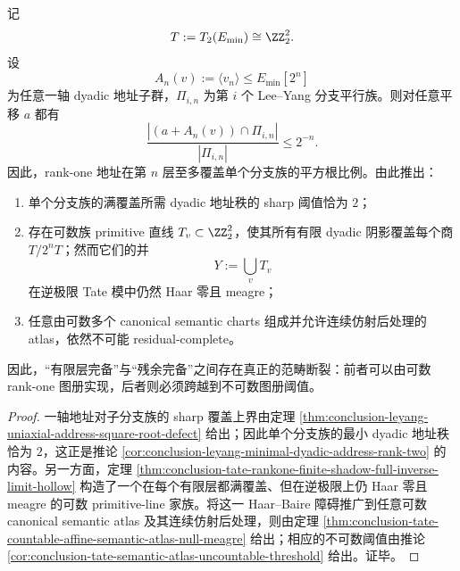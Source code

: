 \begin{theorem}\label{thm:conclusion-rankone-atlas-uncountable-residual-threshold}
记
\[
T:=T_2(E_{\min})\cong \ZZ_2^2.
\]
设
\[
A_n(v):=\langle v_n\rangle\le E_{\min}[2^n]
\]
为任意一轴 dyadic 地址子群，\(\Pi_{i,n}\) 为第 \(i\) 个 Lee--Yang 分支平行族。则对任意平移 \(a\) 都有
\[
\frac{|(a+A_n(v))\cap \Pi_{i,n}|}{|\Pi_{i,n}|}\le 2^{-n}.
\]
因此，rank-one 地址在第 \(n\) 层至多覆盖单个分支族的平方根比例。由此推出：
\begin{enumerate}
  \item 单个分支族的满覆盖所需 dyadic 地址秩的 sharp 阈值恰为 \(2\)；

  \item 存在可数族 primitive 直线 \(T_v\subset \ZZ_2^2\)，使其所有有限 dyadic 阴影覆盖每个商 \(T/2^nT\)；然而它们的并
  \[
  Y:=\bigcup_v T_v
  \]
  在逆极限 Tate 模中仍然 Haar 零且 meagre；

  \item 任意由可数多个 canonical semantic charts 组成并允许连续仿射后处理的 atlas，依然不可能 residual-complete。
\end{enumerate}
因此，“有限层完备”与“残余完备”之间存在真正的范畴断裂：前者可以由可数 rank-one 图册实现，后者则必须跨越到不可数图册阈值。
\end{theorem}
\begin{proof}
一轴地址对子分支族的 sharp 覆盖上界由定理 \ref{thm:conclusion-leyang-uniaxial-address-square-root-defect} 给出；因此单个分支族的最小 dyadic 地址秩恰为 \(2\)，这正是推论 \ref{cor:conclusion-leyang-minimal-dyadic-address-rank-two} 的内容。另一方面，定理 \ref{thm:conclusion-tate-rankone-finite-shadow-full-inverse-limit-hollow} 构造了一个在每个有限层都满覆盖、但在逆极限上仍 Haar 零且 meagre 的可数 primitive-line 家族。将这一 Haar--Baire 障碍推广到任意可数 canonical semantic atlas 及其连续仿射后处理，则由定理 \ref{thm:conclusion-tate-countable-affine-semantic-atlas-null-meagre} 给出；相应的不可数阈值由推论 \ref{cor:conclusion-tate-semantic-atlas-uncountable-threshold} 给出。证毕。
\end{proof}

